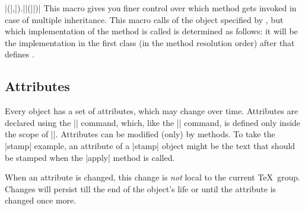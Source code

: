 \begin{pgfmanualentry}
\begin{command}{\pgfoothis}
\begin{codeexample}
\end{codeexample}
  \end{command}
\end{pgfmanualentry}


\begin{command}{\pgfoosuper|(|,|).||(||)|}
  This macro gives you finer control over which method gets invoked in
  case of multiple inheritance. This macro calls  of
  the object specified by , but which
  implementation of the method is called is determined as follows: it
  will be the implementation in the first class (in the method
  resolution order) after  that defines . 
\end{command}

\subsection{Attributes}

Every object has a set of attributes, which may change over
time. Attributes are declared using the |\attribute| command, which,
like the |\method| command, is defined only inside the scope of
|\pgfooclass|. Attributes can be modified (only) by methods. To take
the |stamp| example, an attribute of a |stamp| object might be the
text that should be stamped when the |apply| method is called.

When an attribute is changed, this change is \emph{not} local to the
current \TeX\ group. Changes will persist till the end
of the object's life or until the attribute is changed once more.


